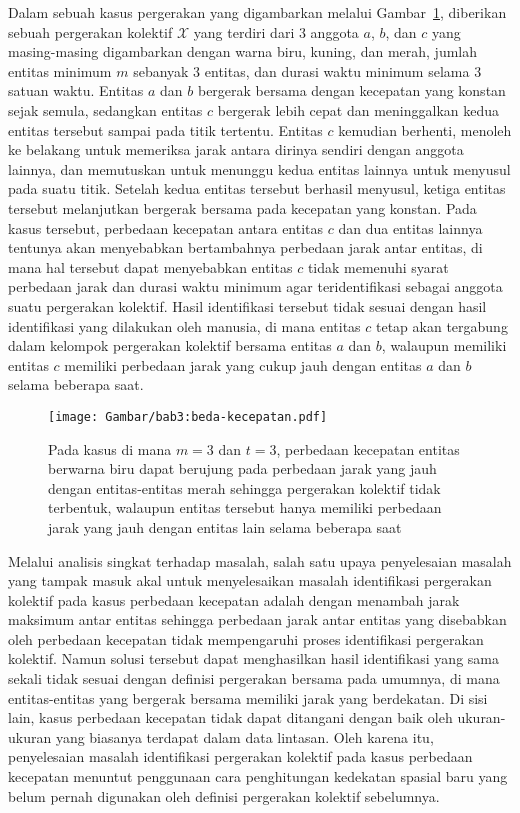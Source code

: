 Dalam sebuah kasus pergerakan yang digambarkan melalui Gambar~\ref{bab3:masalah-kecepatan}, diberikan sebuah pergerakan kolektif $\mathcal{X}$ yang terdiri dari $3$ anggota $a$, $b$, dan $c$ yang masing-masing digambarkan dengan warna biru, kuning, dan merah, jumlah entitas minimum $m$ sebanyak $3$ entitas, dan durasi waktu minimum selama $3$ satuan waktu. Entitas $a$ dan $b$ bergerak bersama dengan kecepatan yang konstan sejak semula, sedangkan entitas $c$ bergerak lebih cepat dan meninggalkan kedua entitas tersebut sampai pada titik tertentu. Entitas $c$ kemudian berhenti, menoleh ke belakang untuk memeriksa jarak antara dirinya sendiri dengan anggota lainnya, dan memutuskan untuk menunggu kedua entitas lainnya untuk menyusul pada suatu titik. Setelah kedua entitas tersebut berhasil menyusul, ketiga entitas tersebut melanjutkan bergerak bersama pada kecepatan yang konstan. Pada kasus tersebut, perbedaan kecepatan antara entitas $c$ dan dua entitas lainnya tentunya akan menyebabkan bertambahnya perbedaan jarak antar entitas, di mana hal tersebut dapat menyebabkan entitas $c$ tidak memenuhi syarat perbedaan jarak dan durasi waktu minimum agar teridentifikasi sebagai anggota suatu pergerakan kolektif. Hasil identifikasi tersebut tidak sesuai dengan hasil identifikasi yang dilakukan oleh manusia, di mana entitas $c$ tetap akan tergabung dalam kelompok pergerakan kolektif bersama entitas $a$ dan $b$, walaupun memiliki entitas $c$ memiliki perbedaan jarak yang cukup jauh dengan entitas $a$ dan $b$ selama beberapa saat.

\begin{figure}[h]
    \centering
    \captionsetup{width=0.8\textwidth}
    \texttt{[image: Gambar/bab3:beda-kecepatan.pdf]}
    \caption[Masalah identifikasi pada kasus perbedaan kecepatan]{Pada kasus di mana $m = 3$ dan $t = 3$, perbedaan kecepatan entitas berwarna biru dapat berujung pada perbedaan jarak yang jauh dengan entitas-entitas merah sehingga pergerakan kolektif tidak terbentuk, walaupun entitas tersebut hanya memiliki perbedaan jarak yang jauh dengan entitas lain selama beberapa saat}
    \label{bab3:masalah-kecepatan}
\end{figure}
    
Melalui analisis singkat terhadap masalah, salah satu upaya penyelesaian masalah yang tampak masuk akal untuk menyelesaikan masalah identifikasi pergerakan kolektif pada kasus perbedaan kecepatan adalah dengan menambah jarak maksimum antar entitas sehingga perbedaan jarak antar entitas yang disebabkan oleh perbedaan kecepatan tidak mempengaruhi proses identifikasi pergerakan kolektif. Namun solusi tersebut dapat menghasilkan hasil identifikasi yang sama sekali tidak sesuai dengan definisi pergerakan bersama pada umumnya, di mana entitas-entitas yang bergerak bersama memiliki jarak yang berdekatan. Di sisi lain, kasus perbedaan kecepatan tidak dapat ditangani dengan baik oleh ukuran-ukuran yang biasanya terdapat dalam data lintasan. Oleh karena itu, penyelesaian masalah identifikasi pergerakan kolektif pada kasus perbedaan kecepatan menuntut penggunaan cara penghitungan kedekatan spasial baru yang belum pernah digunakan oleh definisi pergerakan kolektif sebelumnya.

